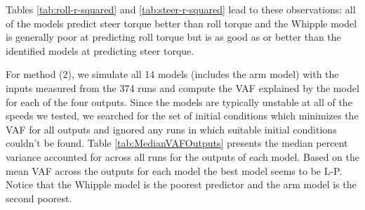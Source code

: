 \documentclass[a4paper]{article}
\begin{document}
Tables \ref{tab:roll-r-squared} and \ref{tab:steer-r-squared} lead to these
observations: all of the models predict steer torque better than roll torque
and the Whipple model is generally poor at predicting roll torque but is as
good as or better than the identified models at predicting steer torque.


For method (2), we simulate all 14 models (includes the arm model) with the
inputs measured from the 374 runs and compute the VAF explained by the model
for each of the four outputs. Since the models are typically unstable at all of
the speeds we tested, we searched for the set of initial conditions which
minimizes the VAF for all outputs and ignored any runs in which suitable
initial conditions couldn't be found. Table \ref{tab:MedianVAFOutputs} presents
the median percent variance accounted for across all runs for the outputs of
each model. Based on the mean VAF across the outputs for each model the best
model seems to be L-P. Notice that the Whipple model is the poorest predictor
and the arm model is the second poorest.
\end{document}
